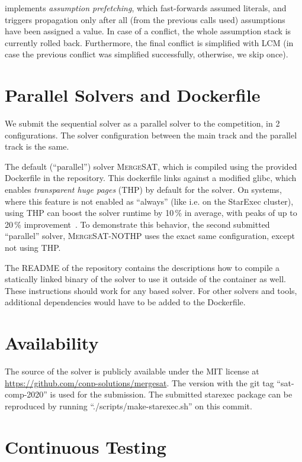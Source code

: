 \documentclass[conference]{IEEEtran}
\begin{document}
\mergesat implements \emph{assumption prefetching}, which fast-forwards assumed literals, and triggers propagation only after all (from the previous calls used) assumptions have been assigned a value.
In case of a conflict, the whole assumption stack is currently rolled back.
Furthermore, the final conflict is simplified with LCM (in case the previous conflict was simplified successfully, otherwise, we skip once).

\section{Parallel Solvers and Dockerfile}

We submit the sequential solver as a parallel solver to the competition, in 2 configurations.
The solver configuration between the main track and the parallel track is the same.

The default (``parallel'') solver  \textsc{MergeSAT}, which is compiled using the provided Dockerfile in the repository.
This dockerfile links against a modified glibc, which enables \emph{transparent huge pages} (THP) by default for the solver.
On systems, where this feature is not enabled as ``always'' (like i.e. on the StarExec cluster), using THP can boost the solver runtime by 10\,\% in average, with peaks of up to 20\,\% improvement~\cite{thp}.
To demonstrate this behavior, the second submitted ``parallel'' solver, \textsc{MergeSAT-NOTHP} uses the exact same configuration, except not using THP.

The README of the \mergesat repository contains the descriptions how to compile a statically linked binary of the solver to use it outside of the container as well.
These instructions should work for any \minisat based solver.
For other solvers and tools, additional dependencies would have to be added to the Dockerfile.

\section{Availability}

The source of the solver is publicly available under the MIT license at \url{https://github.com/conp-solutions/mergesat}.
The version with the git tag ``sat-comp-2020'' is used for the submission.
The submitted starexec package can be reproduced by running ``./scripts/make-starexec.sh'' on this commit.

\section{Continuous Testing}
\end{document}
